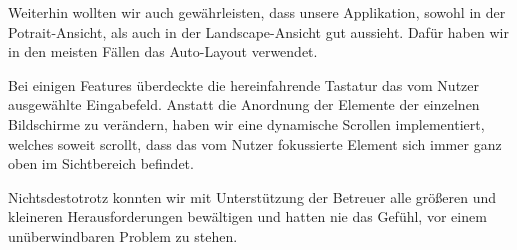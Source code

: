 	Weiterhin wollten wir auch gewährleisten, dass unsere Applikation, sowohl in der Potrait-Ansicht, als auch in der Landscape-Ansicht gut aussieht. Dafür haben wir in den meisten Fällen das Auto-Layout verwendet.
	
	Bei einigen Features überdeckte die hereinfahrende Tastatur das vom Nutzer ausgewählte Eingabefeld. Anstatt die Anordnung der Elemente der einzelnen Bildschirme zu verändern, haben wir eine dynamische Scrollen implementiert, welches soweit scrollt, dass das vom Nutzer fokussierte Element sich immer ganz oben im Sichtbereich befindet.

	Nichtsdestotrotz konnten wir mit Unterstützung der Betreuer alle größeren und kleineren Herausforderungen bewältigen und hatten nie das Gefühl, vor einem unüberwindbaren Problem zu stehen.
	
	